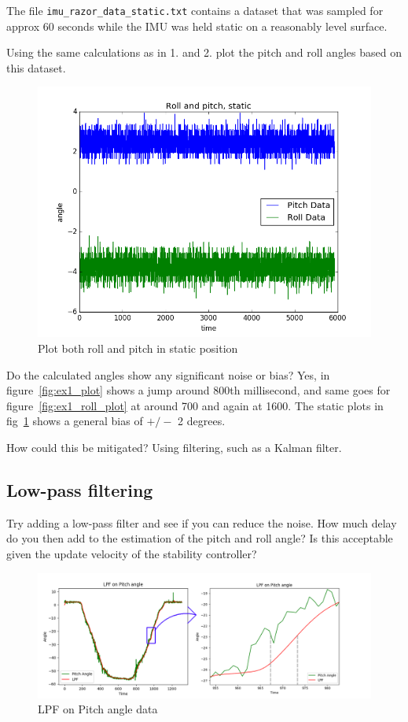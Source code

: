 \documentclass[paper=letter, fontsize=10pt]{article}
\begin{document}
The file \texttt{imu\_razor\_data\_static.txt} contains a dataset that was sampled for approx 60 seconds while the IMU was held static on a reasonably level surface.

Using the same calculations as in 1. and 2. plot the pitch and roll angles based on this dataset.

\begin{figure}[h!]
\centering
\includegraphics[scale=.5]{Figures/ex1_static}
\caption{Plot both roll and pitch in static position}
\label{fig:ex1_static_plot}
\end{figure}

Do the calculated angles show any significant noise or bias? Yes, in figure~\ref{fig:ex1_plot} shows a jump around 800th millisecond, and same goes for figure~\ref{fig:ex1_roll_plot} at around 700 and again at 1600. The static plots in fig~\ref{fig:ex1_static_plot} shows a general bias of $+/-$ 2 degrees.

How could this be mitigated? Using filtering, such as a Kalman filter.


\subsection{Low-pass filtering}

Try adding a low-pass filter and see if you can reduce the noise.
How much delay do you then add to the estimation of the pitch and roll angle?
Is this acceptable given the update velocity of the stability controller?

\begin{figure}[h!]
\centering
\includegraphics[scale=.5]{Figures/ex1_4_pitch_with_filter}
\caption{LPF on Pitch angle data}
\label{fig:ex1_lpf_on_pitch}
\end{figure}
\end{document}
